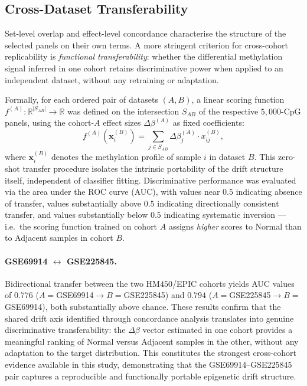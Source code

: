 \subsection{Cross-Dataset Transferability}
\label{sec:inter_fs_transfer}

Set-level overlap and effect-level concordance characterise the
structure of the selected panels on their own terms.
A more stringent criterion for cross-cohort replicability is
\emph{functional transferability}: whether the differential methylation
signal inferred in one cohort retains discriminative power when applied
to an independent dataset, without any retraining or adaptation.

Formally, for each ordered pair of datasets $(A, B)$, a linear scoring
function $f^{(A)}: \mathbb{R}^{|S_{AB}|} \to \mathbb{R}$ was defined on
the intersection $S_{AB}$ of the respective $5{,}000$-CpG panels, using
the cohort-$A$ effect sizes $\Delta\beta^{(A)}$ as fixed coefficients:
\begin{equation}
  f^{(A)}(\mathbf{x}^{(B)}_i) = \sum_{j \in S_{AB}}
  \Delta\beta^{(A)}_j \cdot x^{(B)}_{ij},
  \label{eq:transfer_score}
\end{equation}
where $\mathbf{x}^{(B)}_i$ denotes the methylation profile of sample $i$
in dataset $B$.
This zero-shot transfer procedure isolates the intrinsic portability of
the drift structure itself, independent of classifier fitting.
Discriminative performance was evaluated via the area under the
ROC curve (AUC), with values near $0.5$ indicating absence of transfer,
values substantially above $0.5$ indicating directionally consistent
transfer, and values substantially below $0.5$ indicating systematic
inversion — i.e.\ the scoring function trained on cohort $A$ assigns
\emph{higher} scores to Normal than to Adjacent samples in cohort $B$.

\paragraph{GSE69914 $\leftrightarrow$ GSE225845.}
Bidirectional transfer between the two HM$450$/EPIC cohorts yields
AUC values of $0.776$ ($A{=}$GSE69914$\to B{=}$GSE225845) and
$0.794$ ($A{=}$GSE225845$\to B{=}$GSE69914), both substantially
above chance.
These results confirm that the shared drift axis identified through
concordance analysis translates into genuine discriminative
transferability: the $\Delta\beta$ vector estimated in one cohort
provides a meaningful ranking of Normal versus Adjacent samples in
the other, without any adaptation to the target distribution.
This constitutes the strongest cross-cohort evidence available in
this study, demonstrating that the GSE69914--GSE225845 pair captures
a reproducible and functionally portable epigenetic drift structure.

